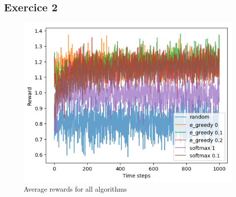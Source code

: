 \documentclass[letterpaper]{article}
\begin{document}
\subsection{Exercice 2}

\begin{figure}[H]
    \centering
    \includegraphics[width=.7\linewidth]{images/assign3/ex2/rewards}
    \caption{Average rewards for all algorithms}
    \label{fig:rewards_ex2}
\end{figure}
\end{document}
